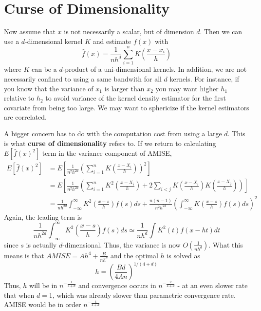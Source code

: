  \section{Curse of Dimensionality}
 Now assume that $x$ is not necessarily a scalar, but of dimension $d$. Then we can use a $d$-dimensional kernel $K$ and estimate $f(x)$ with
 \[
 \hat{f}(x)= \frac{1}{nh^d}\sum_{i=1}^nK\left(\frac{x-x_i}{h}\right)
 \]
 where $K$ can be a $d$-product of a uni-dimensional kernels. In addition, we are not necessarily confined to using a same bandwith for all $d$ kernels. For instance, if you know that the variance of $x_1$ is larger than $x_2$ you may want higher $h_1$ relative to $h_2$ to avoid variance of the kernel density estimator for the first covariate from being too large. We may want to sphericize if the kernel estimators are correlated. \par
 A bigger concern has to do with the computation cost from using a large $d$. This is what \textbf{curse of dimensionality} refers to. If we return to calculating $E[\hat{f}(x)^2]$ term in the variance component of AMISE, 
 \footnotesize{\begin{align*}
 E[\hat{f}(x)^2]&=E\left[\frac{1}{n^2h^{2d}}\left(\sum_{i=1}^nK\left(\frac{x-X_i}{h}\right)\right)^2\right]\\
 &=E\left[\frac{1}{n^2h^{2d}}\left(\sum_{i=1}^nK^2\left(\frac{x-X_i}{h}\right)+2\sum_{i<j} K\left(\frac{x-X_i}{h}\right)K\left(\frac{x-X_j}{h}\right)\right)\right]\\
 &=\frac{1}{nh^{2d}}\int_{-\infty}^\infty K^2\left(\frac{x-s}{h}\right)f(s)ds+\frac{n(n-1)}{n^2h^{2d}}\left(\int_{-\infty}^\infty K\left(\frac{x-s}{h}\right)f(s)ds\right)^2
 \end{align*}}\normalsize
 Again, the leading term is
 \[
\frac{1}{nh^{2d}}\int_{-\infty}^\infty K^2\left(\frac{x-s}{h}\right)f(s)ds \simeq \frac{1}{nh^d}\int K^2(t)f(x-ht)dt
 \]
 since $s$ is actually $d$-dimensional. Thus, the variance is now $O\left(\frac{1}{nh^d}\right)$. What this means is that $AMISE=Ah^4+\frac{B}{nh^d}$ and the optimal $h$ is solved as
 \[
 h=\left(\frac{Bd}{4An}\right)^{1/(4+d)}
 \]
 Thus, $h$ will be in $n^{-\frac{1}{4+d}}$ and convergence occurs in $n^{-\frac{2}{4+d}}$ - at an even slower rate that when $d=1$, which was already slower than parametric convergence rate. AMISE would be in order $n^{-\frac{4}{4+d}}$\par
 
